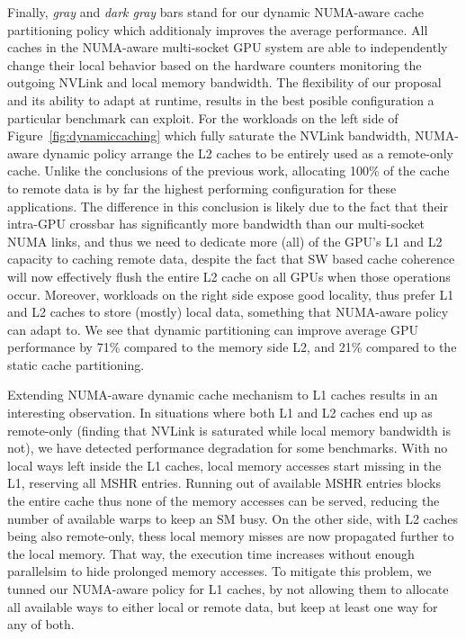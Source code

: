 Finally, \emph{gray} and \emph{dark gray} bars stand for our dynamic NUMA-aware cache partitioning policy which additionaly improves the average performance. All caches in the NUMA-aware multi-socket GPU system are able to independently change their local behavior based on the hardware counters monitoring the outgoing NVLink and local memory bandwidth. The flexibility of our proposal and its ability to adapt at runtime, results in the best posible configuration a particular benchmark can exploit. For the workloads on the left side of Figure~\ref{fig:dynamiccaching} which fully saturate the NVLink bandwidth, NUMA-aware dynamic policy arrange the L2 caches to be entirely used as a remote-only cache. Unlike the conclusions
of the previous work, allocating 100\% of the cache to remote data is by far the highest performing configuration for these applications.
The difference in this conclusion is likely due to the fact that their intra-GPU
crossbar has significantly more bandwidth than our multi-socket NUMA links, and thus
we need to dedicate more (all) of the GPU's L1 and L2 capacity to caching remote data, despite
the fact that SW based cache coherence will now effectively flush the entire L2 cache
on all GPUs when those operations occur. Moreover, workloads on the right side expose good locality, thus prefer L1 and L2 caches to store (mostly) local data, something that NUMA-aware policy can adapt to. We see that dynamic partitioning can improve average GPU performance by 71\% compared to the memory side L2, and 21\% compared to the static cache partitioning. 

Extending NUMA-aware dynamic cache mechanism to L1 caches results in an interesting observation. In situations where both L1 and L2 caches end up as remote-only (finding that NVLink is saturated while local memory bandwidth is not), we have detected performance degradation for some benchmarks. With no local ways left inside the L1 caches, local memory accesses start missing in the L1, reserving all MSHR entries. Running out of available MSHR entries blocks the entire cache thus none of the memory accesses can be served, reducing the number of available warps to keep an SM busy. On the other side, with L2 caches being also remote-only, thess local memory misses are now propagated further to the local memory. That way, the execution time increases without enough parallelsim to hide prolonged memory accesses. To mitigate this problem, we tunned our NUMA-aware policy for L1 caches, by not allowing them to allocate all available ways to either local or remote data, but keep at least one way for any of both. 


